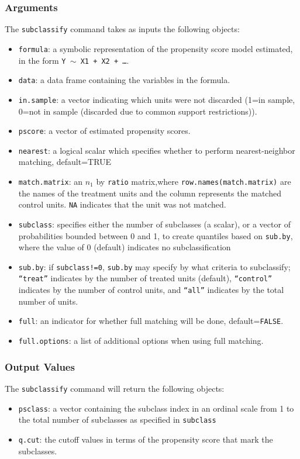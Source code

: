 \documentclass[oneside,letterpaper,titlepage]{article}
\begin{document}
\begin{appendix}
\subsubsection{Arguments}
The \texttt{subclassify} command takes as inputs the following
objects:
\begin{itemize}
\item \texttt{formula}: a symbolic representation of the propensity score
  model estimated, in the form {\tt Y $\sim$ X1 + X2 + \dots}.
\item \texttt{data}: a data frame containing the variables in the formula.
\item \texttt{in.sample}: a vector indicating which units were not discarded
  (1=in sample, 0=not in sample (discarded due to common support
  restrictions)).
\item \texttt{pscore}: a vector of estimated propensity scores.  
\item \texttt{nearest}: a logical scalar which specifies whether
  to perform nearest-neighbor matching, default=TRUE 
\item \texttt{match.matrix}: an $n_1$ by \texttt{ratio} matrix,where
  \texttt{row.names(match.matrix)} are the names of the
  treatment units and the column represents the matched control units.
  \texttt{NA} indicates that the unit was not matched.
\item \texttt{subclass}: specifies either the number of subclasses (a
  scalar), or a vector of probabilities bounded between 0 and 1, to
  create quantiles based on \texttt{sub.by}, where the value of 0
  (default) indicates no subclassification
\item \texttt{sub.by}: if \texttt{subclass!=0}, \texttt{sub.by} may specify by
  what criteria to subclassify; {\tt ``treat''} indicates by the
  number of treated units (default), {\tt ``control''} indicates by
  the number of control units, and {\tt ``all''} indicates by the
  total number of units.
\item \texttt{full}: an indicator for whether full matching will be done, default={\texttt{FALSE}}.
\item \texttt{full.options}: a list of additional options when using full matching.
\end{itemize}

\subsubsection{Output Values}
The \texttt{subclassify} command will return the following objects: 
\begin{itemize}
\item \texttt{psclass}: a vector containing the subclass index in an ordinal scale
  from 1 to the total number of subclasses as specified in
  \texttt{subclass} 
\item \texttt{q.cut}: the cutoff values in terms of the propensity score that
  mark the subclasses.
\end{itemize}


\end{appendix}
\end{document}
